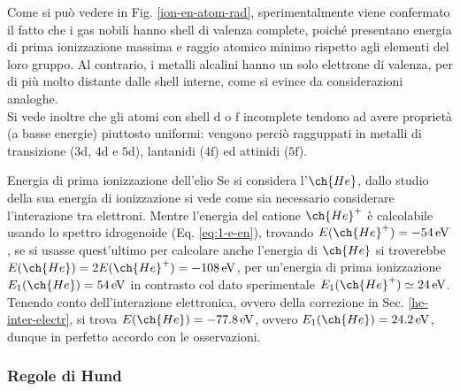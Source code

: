 Come si può vedere in Fig. \ref{ion-en-atom-rad}, sperimentalmente viene confermato il fatto che i gas nobili hanno shell di valenza complete, poiché presentano energia di prima ionizzazione massima e raggio atomico minimo rispetto agli elementi del loro gruppo. Al contrario, i metalli alcalini hanno un solo elettrone di valenza, per di più molto distante dalle shell interne, come si evince da considerazioni analoghe. \\
Si vede inoltre che gli atomi con shell $ \text{d} $ o $ \text{f} $ incomplete tendono ad avere proprietà (a basse energie) piuttosto uniformi: vengono perciò ragguppati in metalli di transizione ($ \text{3d} $, $ \text{4d} $ e $ \text{5d} $), lantanidi ($ \text{4f} $) ed attinidi ($ \text{5f} $).

\begin{example}{Energia di prima ionizzazione dell'elio}{}
	Se si considera l'$ \ch{He} $, dallo studio della sua energia di ionizzazione si vede come sia necessario considerare l'interazione tra elettroni. Mentre l'energia del catione $ \ch{He}^+ $ è calcolabile usando lo spettro idrogenoide (Eq. \ref{eq:1-e-en}), trovando $ E(\ch{He}^+) = -54\ev $, se si usasse quest'ultimo per calcolare anche l'energia di $ \ch{He} $ si troverebbe $ E(\ch{He}) = 2 E(\ch{He}^+) = - 108\ev $, per un'energia di prima ionizzazione $ E_1(\ch{He}) = 54\ev $ in contrasto col dato sperimentale $ E_1(\ch{He}^+) \simeq 24\ev $. Tenendo conto dell'interazione elettronica, ovvero della correzione in Sec. \ref{he-inter-electr}, si trova $ E(\ch{He}) = -77.8\ev $, ovvero $ E_1(\ch{He}) = 24.2\ev $, dunque in perfetto accordo con le osservazioni.
\end{example}

\subsubsection{Regole di Hund}

